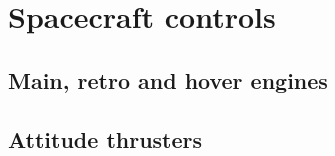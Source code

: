 \documentclass[Orbiter User Manual.tex]{subfiles}
\begin{document}
\section{Spacecraft controls}

\subsection{Main, retro and hover engines}

\subsection{Attitude thrusters}
\end{document}
